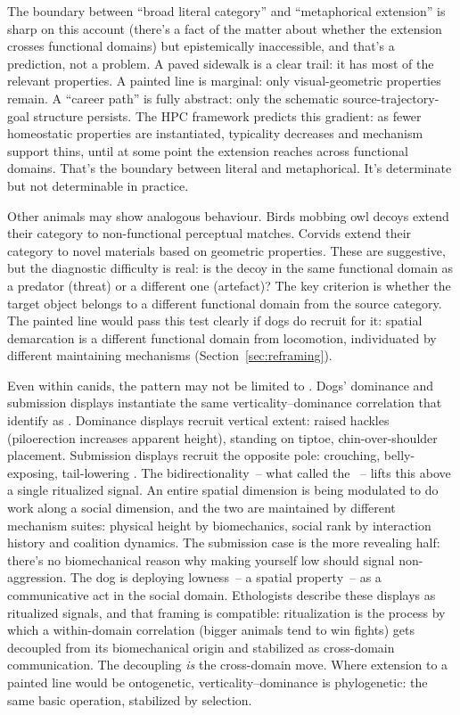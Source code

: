 \documentclass[12pt]{article}
\begin{document}
The boundary between \enquote{broad literal category} and \enquote{metaphorical extension} is sharp on this account (there's a fact of the matter about whether the extension crosses functional domains) but epistemically inaccessible, and that's a prediction, not a problem. A paved sidewalk is a clear trail: it has most of the relevant properties. A painted line is marginal: only visual-geometric properties remain. A \enquote{career path} is fully abstract: only the schematic source-trajectory-goal structure persists. The HPC framework predicts this gradient: as fewer homeostatic properties are instantiated, typicality decreases and mechanism support thins, until at some point the extension reaches across functional domains. That's the boundary between literal and metaphorical. It's determinate but not determinable in practice.

Other animals may show analogous behaviour. Birds mobbing owl decoys extend their  category to non-functional perceptual matches. Corvids extend their  category to novel materials based on geometric properties. These are suggestive, but the diagnostic difficulty is real: is the decoy in the same functional domain as a predator (threat) or a different one (artefact)? The key criterion is whether the target object belongs to a different functional domain from the source category. The painted line would pass this test clearly if dogs do recruit  for it: spatial demarcation is a different functional domain from locomotion, individuated by different maintaining mechanisms (Section~\ref{sec:reframing}).

Even within canids, the pattern may not be limited to . Dogs' dominance and submission displays instantiate the same verticality--dominance correlation that \textcite{lakoff1980} identify as . Dominance displays recruit vertical extent: raised hackles (piloerection increases apparent height), standing on tiptoe, chin-over-shoulder placement. Submission displays recruit the opposite pole: crouching, belly-exposing, tail-lowering \citep{schenkel1967}. The bidirectionality~-- what \textcite{darwin1872} called the ~-- lifts this above a single ritualized signal. An entire spatial dimension is being modulated to do work along a social dimension, and the two are maintained by different mechanism suites: physical height by biomechanics, social rank by interaction history and coalition dynamics. The submission case is the more revealing half: there's no biomechanical reason why making yourself low should signal non-aggression. The dog is deploying lowness~-- a spatial property~-- as a communicative act in the social domain. Ethologists describe these displays as ritualized signals, and that framing is compatible: ritualization is the process by which a within-domain correlation (bigger animals tend to win fights) gets decoupled from its biomechanical origin and stabilized as cross-domain communication. The decoupling \emph{is} the cross-domain move. Where  extension to a painted line would be ontogenetic, verticality--dominance is phylogenetic: the same basic operation, stabilized by selection.
\end{document}
